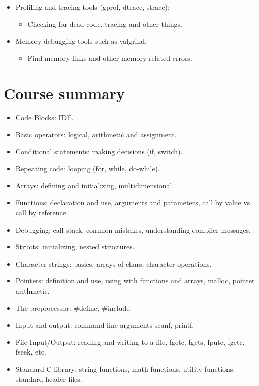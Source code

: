 \begin{itemize}
    \item Profiling and tracing tools (gprof, dtrace, strace):
        \begin{itemize}
            \item Checking for dead code, tracing and other things.
        \end{itemize}
    
    \item Memory debugging tools such as valgrind.
        \begin{itemize}
            \item Find memory links and other memory related errors.
        \end{itemize}
\end{itemize}


\section{Course summary}
\begin{itemize}
    \item Code Blocks: IDE.
    \item Basic operators: logical, arithmetic and assignment.
    \item Conditional statements: making decisions (if, switch).
    \item Repeating code: looping (for, while, do-while).
    \item Arrays: defining and initializing, multidimensional. 
    \item Functions: declaration and use, arguments and parameters, call by value vs. call by reference.
    \item Debugging: call stack, common mistakes, understanding compiler messages. 
    \item Structs: initializing, nested structures. 
    \item Character strings: basics, arrays of chars, character operations.
    \item Pointers: definition and use, using with functions and arrays, malloc, pointer arithmetic. 
    \item The preprocessor: \#define, \#include.
    \item Input and output: command line arguments scanf, printf. 
    \item File Input/Output: reading and writing to a file, fgetc, fgets, fputc, fgetc, fseek, etc. 
    \item Standard C library: string functions, math functions, utility functions, standard header files.
\end{itemize}

